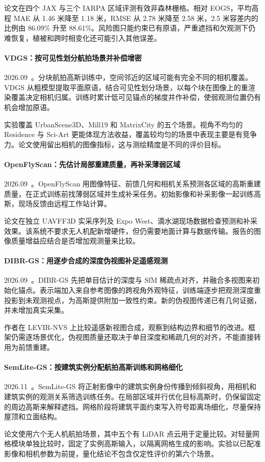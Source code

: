 论文在四个 JAX 与三个 IARPA 区域评测有效非森林栅格。相对 EOGS，平均高程 MAE 从 1.46 米降至 1.18 米，RMSE 从 2.78 米降至 2.58 米，2.5 米容差内的比例由 86.09\% 升至 88.61\%。风险图只能约束已有原语，严重遮挡和欠观测下仍难恢复，植被和跨时相变化还可能引入其他误差。

\paragraph{VDGS：按可见性划分航拍场景并补偿增密}
2026.09~\cite{2609_23049}。分块航拍高斯训练中，空间邻近的区域可能有完全不同的相机覆盖。VDGS 从粗模型提取平面原语，结合可见性划分场景，以每个块在图像上的重渲染覆盖决定相机归属。训练时累计低可见锚点的梯度并作补偿，使弱观测位置仍有机会增加原语。

实验覆盖 UrbanScene3D、Mill19 和 MatrixCity 的五个场景。视角不均匀的 Residence 与 Sci-Art 更能体现方法收益，覆盖较均匀的场景中表现主要是有竞争力。论文使用留出相机的图像指标，这与测绘精度是不同的评价目标。

\paragraph{OpenFlyScan：先估计局部重建质量，再补采薄弱区域}
2026.09~\cite{2609_24253}。OpenFlyScan 用图像特征、前馈几何和相机关系预测各区域的高斯重建质量，在正式训练前找薄弱区域并生成补采任务。初始影像和补采影像一起训练高斯，现场反馈由远程工作站计算。

论文在独立 UAVFF3D 实采序列及 Expo West、滴水湖现场数据检查预测和补采效果。该系统不要求无人机配新增硬件，但仍需要地面计算与数据传输。报告的图像质量增益应结合是否增加观测量来比较。

\paragraph{DIBR-GS：用逐步合成的深度伪视图补足遥感观测}
2026.09~\cite{2609_35612}。DIBR-GS 先把单目估计的深度与 SfM 稀疏点对齐，并融合多视图来初始化锚点。表示端加入来自参考图像的跨视角外观特征，训练端逐步把观测深度重投影到未观测视点，为高斯提供附加一致性约束。新的伪视图传递已有几何证据，并未增加真实采集。

作者在 LEVIR-NVS 上比较遥感新视图合成，观察到结构边界和细节的改进。框架仍需逐场景优化，伪视图质量还取决于单目深度和稀疏几何的对齐，不能直接转用为前馈重建。

\paragraph{SemLite-GS：按建筑实例分配航拍高斯训练和网格细化}
2026.11~\cite{2611_19773}。SemLite-GS 将正射影像中的建筑实例身份传播到倾斜视角，用相机和建筑实例的观测关系筛选训练任务。在局部区域并行优化目标高斯时，仍保留固定的周边高斯来解释遮挡。网格阶段将建筑平面约束写入符号距离场细化，尽量保持屋顶和立面结构。

论文使用六个无人机航拍场景，其中五个有 LiDAR 点云用于定量比较。对轻量网格模块单独比较时，固定了实例高斯输入，以隔离网格生成的影响。实验以已配准影像和相机参数为前提，量化结论不包含仅定性评价的第六个场景。
